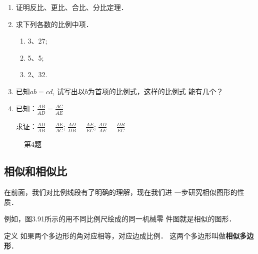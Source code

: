 \begin{ex}
\begin{enumerate}
    \item 证明反比、更比、合比、分比定理．
    \item 求下列各数的比例中项．
\begin{multicols}{3}
    \begin{enumerate}
        \item 3、27;
        \item 5、5;
        \item 2、32.
    \end{enumerate}
\end{multicols}
\item 已知$ab=cd$, 试写出以$b$为首项的比例式，这样的比例式
    能有几个？
    \item 已知：$\frac{\overline{AB}}{\overline{AD}}=\frac{\overline{AC}}{\overline{AE}}$

    求证：$\frac{\overline{AD}}{\overline{AB}}=\frac{\overline{AE}}{\overline{AC}}$; $\frac{\overline{AD}}{\overline{DB}}=\frac{\overline{AE}}{\overline{EC}}$; $\frac{\overline{AD}}{\overline{AE}}=\frac{\overline{DB}}{\overline{EC}}$
\end{enumerate}
\end{ex}

\begin{figure}[htp]
    \centering
{}
    \caption*{第4题}
\end{figure}


\subsection{相似和相似比}
在前面，我们对比例线段有了明确的理解，现在我们进
一步研究相似图形的性质．

例如，图3.91所示的用不同比例尺绘成的同一机械零
件图就是相似的图形．

\begin{blk}
    {定义} 如果两个多边形的角对应相等，对应边成比例．
这两个多边形叫做\textbf{相似多边形}．
\end{blk}

